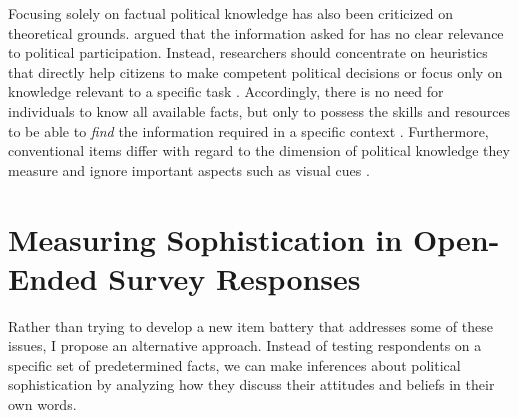 \documentclass[12pt]{article}
\begin{document}
Focusing solely on factual political knowledge has also been criticized on theoretical grounds. \citet{lupia2006elitism} argued that the information asked for has no clear relevance to political participation. Instead, researchers should concentrate on heuristics that directly help citizens to make competent political decisions or focus only on knowledge relevant to a specific task \citep[see also][]{lupia1994shortcuts}. Accordingly, there is no need for individuals to know all available facts, but only to possess the skills and resources to be able to \textit{find} the information required in a specific context \citep{prior2008money}. Furthermore, conventional items differ with regard to the dimension of political knowledge they measure \citep{barabas2014question} and ignore important aspects such as visual cues \citep{prior2014visual}.




\section*{Measuring Sophistication in Open-Ended Survey Responses}


Rather than trying to develop a new item battery that addresses some of these issues, I propose an alternative approach. Instead of testing respondents on a specific set of predetermined facts, we can make inferences about political sophistication by analyzing how they discuss their attitudes and beliefs in their own words.
\end{document}
